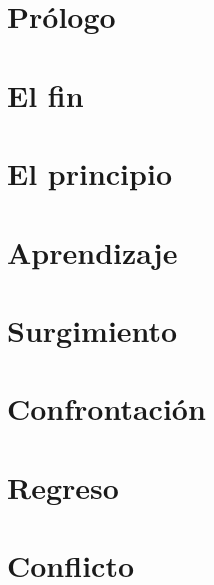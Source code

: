 \documentclass[11pt,a5paper]{book}
\title{\textbf{\Huge\thetitle}\\\textsc{\small\thesubtitle}}
\author{\textit{\theauthor}}
\date{}
\begin{document}


\frontmatter
\maketitle

\thispagestyle{empty}


\cleardoublepage
\raggedcolumns
\tableofcontents
\flushcolumns

\chapter{Prólogo}
\par


\mainmatter
{}
\chapter{El fin}


\chapter{El principio}


\chapter{Aprendizaje}


\chapter{Surgimiento}


\chapter{Confrontación}


\chapter{Regreso}


\chapter{Conflicto}

\end{document}
